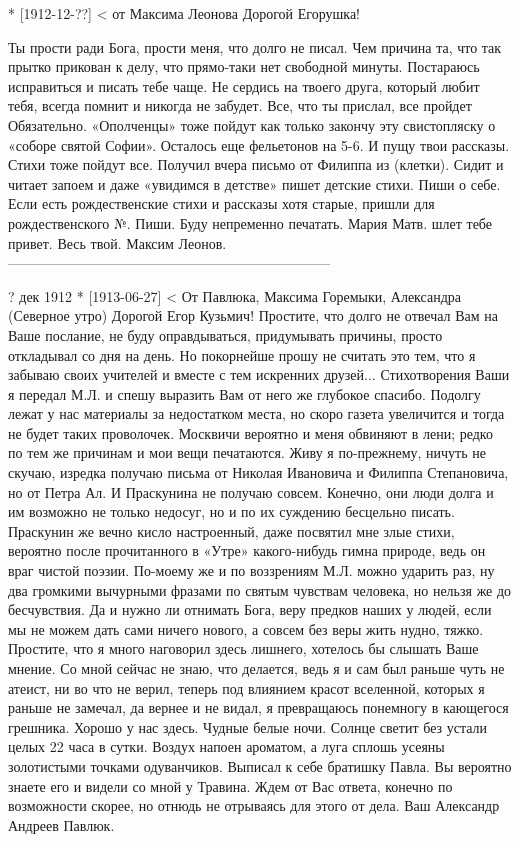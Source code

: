 * [1912-12-??] < от Максима Леонова
Дорогой Егорушка!

Ты прости ради Бога, прости меня, что долго не писал.
Чем причина та, что так прытко прикован к делу, что прямо-таки нет свободной минуты. Постараюсь исправиться и писать тебе чаще. Не сердись на твоего друга, который любит тебя, всегда помнит и никогда не забудет. Все, что ты прислал, все пройдет Обязательно. «Ополченцы» тоже пойдут как только закончу  эту свистопляску о «соборе святой Софии». Осталось еще фельетонов на 5-6. И пущу твои рассказы. Стихи тоже пойдут все.  Получил вчера письмо от Филиппа из (клетки).  Сидит и читает запоем и даже «увидимся в детстве» пишет детские стихи. Пиши о себе.
Если есть рождественские стихи и рассказы хотя старые, пришли для рождественского №. Пиши. Буду непременно печатать.  Мария Матв. шлет тебе привет.
           Весь твой. Максим Леонов.
--------------------------------------------------------------------- 
 
? дек 1912
* [1913-06-27] < От Павлюка, Максима Горемыки, Александра (Северное утро)
Дорогой 
Егор Кузьмич!
Простите, что долго не отвечал Вам на Ваше послание, не буду оправдываться, придумывать причины, просто откладывал со дня на день. Но покорнейше прошу не считать это тем, что я забываю своих учителей и вместе с тем искренних друзей...  Стихотворения Ваши я передал М.Л. и спешу выразить Вам от него же глубокое спасибо. Подолгу лежат у нас материалы за недостатком места, но скоро газета увеличится и тогда не будет таких проволочек. Москвичи вероятно и меня обвиняют в лени; редко по тем же причинам и мои вещи печатаются. Живу я по-прежнему, ничуть не скучаю, изредка получаю письма от Николая Ивановича и Филиппа Степановича, но от Петра Ал. И Праскунина не получаю совсем. Конечно, они люди долга и им возможно не только недосуг, но и по их суждению бесцельно писать.
Праскунин же вечно кисло настроенный, даже посвятил мне злые стихи, вероятно после прочитанного в «Утре» какого-нибудь гимна природе, ведь он враг чистой поэзии. По-моему же и по воззрениям М.Л. можно ударить раз, ну два громкими вычурными фразами по святым чувствам человека, но нельзя же до бесчувствия. Да и нужно ли отнимать Бога, веру предков наших у людей, если мы не можем дать сами ничего нового, а совсем без веры жить нудно, тяжко.
Простите, что я много наговорил здесь лишнего, хотелось бы слышать Ваше мнение.
Со мной сейчас не знаю, что делается, ведь я и сам был раньше чуть не атеист, ни во что не верил, теперь под влиянием красот вселенной, которых я раньше не замечал, да вернее и не видал, я превращаюсь понемногу в кающегося грешника.
Хорошо у нас здесь. Чудные белые ночи. Солнце светит без устали целых 22 часа в сутки. Воздух напоен ароматом, а луга сплошь усеяны золотистыми точками одуванчиков.
Выписал к себе братишку Павла. Вы вероятно знаете его и видели со мной у Травина.
Ждем от Вас ответа, конечно по возможности скорее, но отнюдь не отрываясь для этого от дела.
              Ваш Александр Андреев Павлюк.

